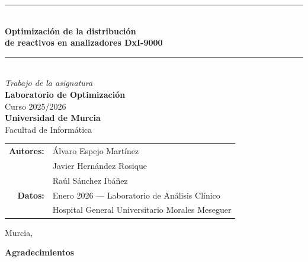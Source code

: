 \documentclass[12pt, a4paper]{article}
\begin{document}

\begin{titlepage}
\thispagestyle{empty}
\centering

\vspace*{1.5cm}
\rule{\linewidth}{0.5pt}\\[0.4cm]

{\fontsize{22}{26}\selectfont\bfseries
  Optimización de la distribución\\[6pt]
  de reactivos en analizadores DxI-9000}\\[0.3cm]

\rule{\linewidth}{0.5pt}\\[1.8cm]

{\large\itshape Trabajo de la asignatura}\\[0.4cm]
{\LARGE\bfseries Laboratorio de Optimización}\\[0.3cm]
{\large Curso 2025/2026}\\[2cm]

{\large\bfseries Universidad de Murcia}\\[0.3cm]
{\normalsize Facultad de Informática}\\[2.5cm]

\begin{tabular}{rl}
  \textbf{Autores:} & Álvaro Espejo Martínez \\
                    & Javier Hernández Rosique \\
                    & Raúl Sánchez Ibáñez \\[1.2em]
  \textbf{Datos:}   & Enero 2026 --- Laboratorio de Análisis Clínico \\
                    & Hospital General Universitario Morales Meseguer \\
\end{tabular}

\vfill
{\small Murcia, \the\year}

\end{titlepage}

\clearpage
\thispagestyle{empty}
\vspace*{3cm}
{\Large\bfseries Agradecimientos}
\vspace{1.5em}
\end{document}
